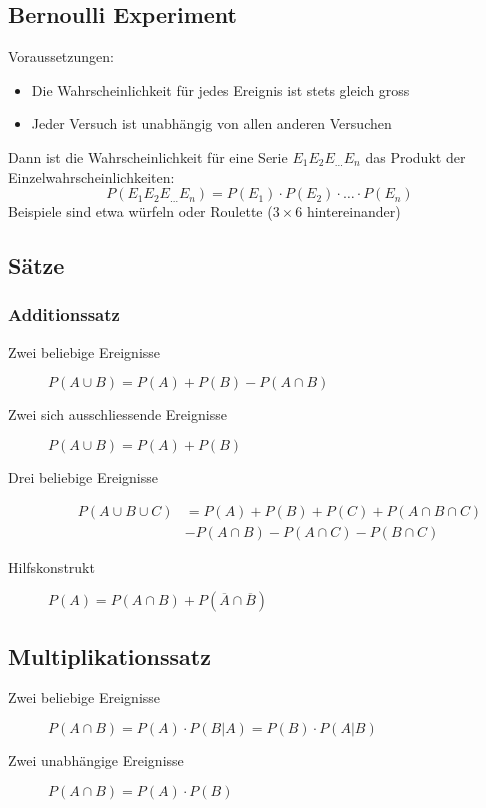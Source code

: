 \subsection{Bernoulli Experiment}
Voraussetzungen:
\begin{itemize}\itemsep0em
	\item Die Wahrscheinlichkeit für jedes Ereignis ist stets gleich gross
	\item Jeder Versuch ist unabhängig von allen anderen Versuchen
\end{itemize}
Dann ist die Wahrscheinlichkeit für eine Serie $E_1E_2E_{\dots}E_n$ das Produkt der Einzelwahrscheinlichkeiten:
\begin{equation*}
	P(E_1E_2E_{\dots}E_n) = P(E_1) \cdot P(E_2) \cdot \dots \cdot P(E_n)
\end{equation*}
Beispiele sind etwa würfeln oder Roulette ($3 \times 6$ hintereinander)

\subsection{Sätze}


\subsubsection{Additionssatz}
\begin{description}
	\item [Zwei beliebige Ereignisse] $P(A \cup B) = P(A) + P(B) - P(A \cap B)$
	\item [Zwei sich ausschliessende Ereignisse] $P(A \cup B) = P(A) + P(B)$
	\item [Drei beliebige Ereignisse]
	\begin{align*}
			P(A \cup B \cup C)& = P(A) + P(B) + P(C) + P(A \cap B \cap C)\\
			& - P(A \cap B) - P(A \cap C) - P(B \cap C)
	\end{align*}
	\item [Hilfskonstrukt] $P(A) = P(A \cap B) + P(\overline{A} \cap \overline{B})$
\end{description}

\subsection{Multiplikationssatz}
\begin{description}
	\item [Zwei beliebige Ereignisse] $P(A \cap B) = P(A) \cdot P(B|A) = P(B) \cdot P(A|B)$
	\item [Zwei unabhängige Ereignisse] $P(A \cap B) = P(A) \cdot P(B)$
\end{description}

